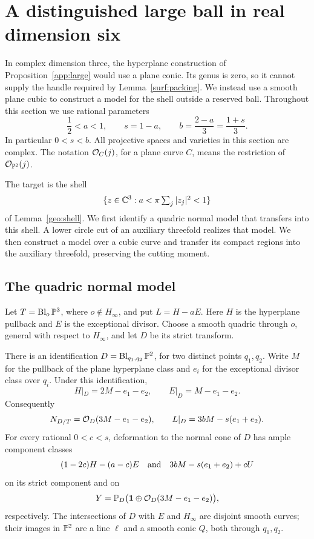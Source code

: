 \section{A distinguished large ball in real dimension six}
\label{six:section}

In complex dimension three, the hyperplane construction of
Proposition~\ref{app:large} would use a plane conic.  Its genus is zero,
so it cannot supply the handle required by Lemma~\ref{surf:packing}.
We instead use a smooth plane cubic to construct a model for the shell
outside a reserved ball.  Throughout this section we use rational parameters
\begin{equation}\label{six:parameters}
 \frac12<a<1,\qquad s=1-a,\qquad
 b=\frac{2-a}{3}=\frac{1+s}{3}.
\end{equation}
In particular \(0<s<b\).  All projective spaces and varieties in this
section are complex.  The notation \(\mathcal O_C(j)\), for a plane curve \(C\),
means the restriction of \(\mathcal O_{\mathbb P^2}(j)\).

The target is the shell
\[
 \{z\in\mathbb C^3:a<\pi\textstyle\sum_j|z_j|^2<1\}
\]
of Lemma~\ref{geo:shell}.  We first identify a quadric normal model that
transfers into this shell.  A lower circle cut of an auxiliary threefold
realizes that model.  We then construct a model over a cubic curve and
transfer its compact regions into the auxiliary threefold, preserving
the cutting moment.

\subsection{The quadric normal model}

Let \(T=\operatorname{Bl}_o\mathbb P^3\), where \(o\notin H_\infty\), and put
\(L=H-aE\).  Here \(H\) is the hyperplane pullback and \(E\) is the
exceptional divisor.  Choose a smooth quadric through \(o\), general
with respect to \(H_\infty\), and let \(D\) be its strict transform.

\begin{lemma}\label{six:quadric}
There is an identification \(D=\operatorname{Bl}_{q_1,q_2}\mathbb P^2\), for two distinct
points \(q_1,q_2\). Write \(M\) for the pullback of the plane hyperplane
class and \(e_i\) for the exceptional divisor class over \(q_i\).
Under this identification,
\begin{equation}\label{six:quadric-classes}
 H|_D=2M-e_1-e_2,\qquad E|_D=M-e_1-e_2.
\end{equation}
Consequently
\begin{equation}\label{six:normal-class}
 N_{D/T}=\mathcal O_D(3M-e_1-e_2),\qquad
 L|_D=3bM-s(e_1+e_2).
\end{equation}
For every rational \(0<c<s\), deformation to the normal cone of \(D\)
has ample component classes
\[
 (1-2c)H-(a-c)E
 \quad\hbox{and}\quad
 3bM-s(e_1+e_2)+cU
\]
on its strict component and on
\begin{equation}\label{six:Y}
 Y=\mathbb P_D\bigl(\mathbf1\oplus\mathcal O_D(3M-e_1-e_2)\bigr),
\end{equation}
respectively.  The intersections of \(D\) with \(E\) and \(H_\infty\)
are disjoint smooth curves; their images in \(\mathbb P^2\) are a line
\(\ell\) and a smooth conic \(Q\), both through \(q_1,q_2\).
\end{lemma}

